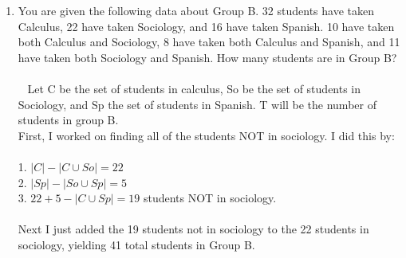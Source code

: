\documentclass{amsart}
\theoremstyle{definition}
\theoremstyle{Exercise}
\theoremstyle{remark}
\theoremstyle{rule}
\numberwithin{equation}{section}
\begin{document}
\begin{enumerate}[label=(\roman*)]
\item You are given the following data about Group B. 32 students have taken Calculus, 22 have taken Sociology, and 16 have taken Spanish. 10 have taken both Calculus and Sociology, 8 have taken both Calculus and Spanish, and 11 have taken both Sociology and Spanish. How many students are in Group B?\\\\\
Let C be the set of students in calculus, So be the set of students in Sociology, and Sp the set of students in Spanish. T will be the number of students in group B.\\ 
First, I worked on finding all of the students NOT in sociology. I did this by:\\\\
1. $|C| - |C \cup So| = 22$\\
2. $|Sp| - |So \cup Sp| = 5$\\
3. $22 + 5 - |C \cup Sp| = 19$ students NOT in sociology.\\
\\
Next I just added the 19 students not in sociology to the 22 students in sociology, yielding 41 total students in Group B.
\\\\\
         \end{enumerate}
 \newpage
\end{document}
